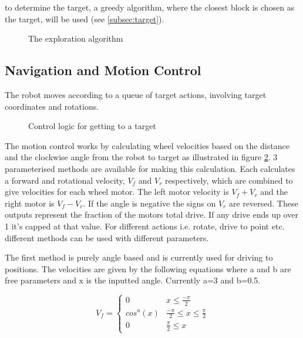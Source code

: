 to determine the target, a greedy algorithm, where the closest block is chosen as the target, will be used (see \cref{subsec:target}).

\begin{figure}[H]
    \centering
    
    \caption{The exploration algorithm}
    \label{fig:flow_target}
\end{figure}




\subsection{Navigation and Motion Control}

The robot moves according to a queue of target actions, involving target coordinates and rotations.

\begin{figure}[H]
    \centering
    
    \caption{Control logic for getting to a target}
    \label{fig:flow_motion}
\end{figure}


The motion control works by calculating wheel velocities based on the distance and the clockwise angle from the robot to target as illustrated in figure \ref{fig:flow_motion}. 3 parameterised methods are available for making this calculation. Each calculates a forward and rotational velocity, $V_f$ and $V_r$ respectively, which are combined to give velocities for each wheel motor. The left motor velocity is $V_f + V_r$ and the right motor is $V_f - V_r$. If the angle is negative the signs on $V_r$ are reversed. These outputs represent the fraction of the motors total drive. If any drive ends up over 1 it's capped at that value. For different actions i.e. rotate, drive to point etc. different methods can be used with different parameters. 

The first method is purely angle based and is currently used for driving to positions. The velocities are given by the following equations where a and b are free parameters and x is the inputted angle. Currently a=3 and b=0.5.

\begin{equation}
    V_f = 
    \begin{cases} 
      0 & x\leq \frac{-\pi}{2} \\
      cos^a(x) & \frac{-\pi}{2} \leq x\leq \frac{\pi}{2} \\
      0 & \frac{\pi}{2} \leq x 
   \end{cases}
\end{equation}

